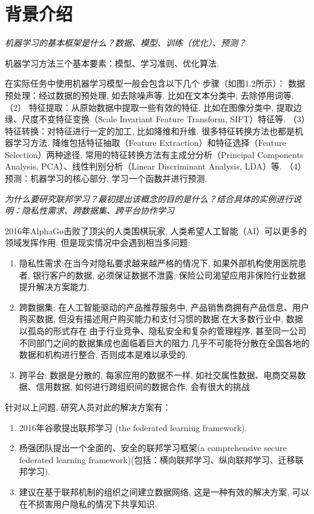 \documentclass[a4paper]{article}
\begin{document}
\section{背景介绍}

\emph{机器学习的基本框架是什么？数据、模型、训练（优化）、预测？}

机器学习方法三个基本要素：模型、学习准则、优化算法.

在实际任务中使用机器学习模型一般会包含以下几个
步骤（如图1.2所示）：
数据预处理：经过数据的预处理, 如去除噪声等. 比如在文本分类中, 去除停用词等.
（2） 特征提取：从原始数据中提取一些有效的特征. 比如在图像分类中, 提取边缘、尺度不变特征变换（Scale Invariant Feature Transform, SIFT）特征等.
（3） 特征转换：对特征进行一定的加工, 比如降维和升维. 很多特征转换方法也都是机器学习方法.
降维包括特征抽取（Feature Extraction）和特征选择（Feature Selection）两种途径. 常用的特征转换方法有主成分分析（Principal Components Analysis, PCA）、线性判别分析（Linear Discriminant Analysis, LDA）等.
（4） 预测：机器学习的核心部分, 学习一个函数并进行预测.




\emph{为什么要研究联邦学习？最初提出该概念的目的是什么？结合具体的实例进行说明：隐私性需求、跨数据集、跨平台协作学习}

2016年AlphaGo击败了顶尖的人类围棋玩家,  人类希望人工智能（AI）可以更多的领域发挥作用. 
但是现实情况中会遇到相当多问题:   
\begin{enumerate}
    \item 隐私性需求:在当今对隐私要求越来越严格的情况下, 如果外部机构使用医院患者, 银行客户的数据, 必须保证数据不泄露; 保险公司渴望应用非保险行业数据提升解决方案能力.
    \item 跨数据集: 在人工智能驱动的产品推荐服务中, 产品销售商拥有产品信息、用户购买数据, 但没有描述用户购买能力和支付习惯的数据.在大多数行业中, 数据以孤岛的形式存在.由于行业竞争、隐私安全和复杂的管理程序, 甚至同一公司不同部门之间的数据集成也面临着巨大的阻力.几乎不可能将分散在全国各地的数据和机构进行整合, 否则成本是难以承受的.
    \item 跨平台: 数据是分散的, 每家应用的数据不一样,  如社交属性数据、电商交易数据、信用数据,  如何进行跨组织间的数据合作, 会有很大的挑战

    
\end{enumerate} 
 
 
针对以上问题, 研究人员对此的解决方案有：
\citep{yang2019federated}
\begin{enumerate}    
\item 2016年谷歌提出联邦学习 (the federated learning framework).
\citep{brendan2016communication}
\item 杨强团队提出一个全面的、安全的联邦学习框架(a comprehensive secure federated learning framework)(包括：横向联邦学习、纵向联邦学习、迁移联邦学习).
\item 建议在基于联邦机制的组织之间建立数据网络, 这是一种有效的解决方案, 可以在不损害用户隐私的情况下共享知识.  
\end{enumerate} 
\end{document}
